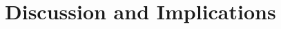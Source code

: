 \documentclass[sigconf]{acmart}
\begin{document}



\section{Discussion and Implications}\label{sec:progs} 

\end{document}
